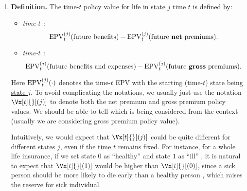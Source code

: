 \begin{enumerate}
\item \textbf{Definition.} The time-\(t\) policy value for life in
\underline{state \(j\)}  time \(t\) is defined by:
\begin{itemize}
\item \emph{time-\(t\) :}
\[
\operatorname{EPV}_{t}^{(j)}(\text{future benefits})-\operatorname{EPV}_{t}^{(j)}(\text{future \textbf{net} premiums}).\]
\item \emph{time-\(t\) :}
\[
\operatorname{EPV}_{t}^{(j)}(\text{future benefits and expenses})-\operatorname{EPV}_{t}^{(j)}(\text{future \textbf{gross} premiums}).\]
\end{itemize}
Here \(\operatorname{EPV}_{t}^{(j)}(\cdot)\) denotes the time-\(t\) EPV with the starting
(time-\(t\)) state being \underline{state \(j\)}. To avoid complicating the
notations, we usually just use the notation \(\Vx[t]{}[(j)]\) to denote both the
net premium and gross premium policy values. We should be able to tell which is
being considered from the context (usually we are considering gross premium
policy value).

Intuitively, we would expect that \(\Vx[t]{}[(j)]\) could be quite different
for different states \(j\), even if the time \(t\) remains fixed. For instance,
for a whole life insurance, if we set state \(0\) as ``healthy''  and state
\(1\) as ``ill'' , it is natural to expect that
\(\Vx[t]{}[(1)]\) would be higher than \(\Vx[t]{}[(0)]\), since a sick person
 should be more likely to die  early than
a healthy person , which raises the reserve for sick individual.


\end{enumerate}

